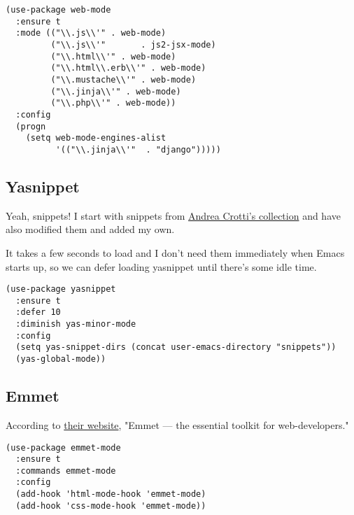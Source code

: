 \documentclass[11pt]{article}
\begin{document}
\begin{verbatim}
(use-package web-mode
  :ensure t
  :mode (("\\.js\\'" . web-mode)
         ("\\.js\\'"       . js2-jsx-mode)
         ("\\.html\\'" . web-mode)
         ("\\.html\\.erb\\'" . web-mode)
         ("\\.mustache\\'" . web-mode)
         ("\\.jinja\\'" . web-mode)
         ("\\.php\\'" . web-mode))
  :config
  (progn
    (setq web-mode-engines-alist
          '(("\\.jinja\\'"  . "django")))))
\end{verbatim}

\subsection{Yasnippet}
\label{sec-18-37}

Yeah, snippets! I start with snippets from \href{https://github.com/AndreaCrotti/yasnippet-snippets}{Andrea Crotti's collection}
and have also modified them and added my own.

It takes a few seconds to load and I don't need them immediately when
Emacs starts up, so we can defer loading yasnippet until there's some
idle time.

\begin{verbatim}
(use-package yasnippet
  :ensure t
  :defer 10
  :diminish yas-minor-mode
  :config
  (setq yas-snippet-dirs (concat user-emacs-directory "snippets"))
  (yas-global-mode))
\end{verbatim}

\subsection{Emmet}
\label{sec-18-38}

According to \href{http://emmet.io/}{their website}, "Emmet — the essential toolkit for web-developers."

\begin{verbatim}
(use-package emmet-mode
  :ensure t
  :commands emmet-mode
  :config
  (add-hook 'html-mode-hook 'emmet-mode)
  (add-hook 'css-mode-hook 'emmet-mode))
\end{verbatim}
\end{document}
